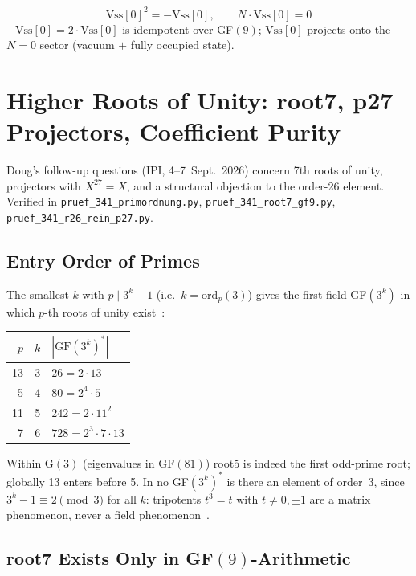 \begin{equation}
  \text{Vss}[0]^2 = -\text{Vss}[0], \qquad N \cdot \text{Vss}[0] = 0
\end{equation}
$-\text{Vss}[0] = 2\cdot\text{Vss}[0]$ is idempotent over GF$(9)$;
$\text{Vss}[0]$ projects onto the $N=0$ sector (vacuum $+$ fully occupied state).

\section{Higher Roots of Unity: root7, p27 Projectors, Coefficient Purity}

Doug's follow-up questions (IPI, 4--7~Sept.~2026) concern 7th roots of unity,
projectors with $X^{27}=X$, and a structural objection to the order-26 element.
Verified in \texttt{pruef\_341\_primordnung.py},
\texttt{pruef\_341\_root7\_gf9.py}, \texttt{pruef\_341\_r26\_rein\_p27.py}.

\subsection{Entry Order of Primes}

The smallest $k$ with $p \mid 3^k-1$ (i.e.\ $k=\mathrm{ord}_p(3)$) gives the
first field GF$(3^k)$ in which $p$-th roots of unity exist~\BM:
\begin{center}
\begin{tabular}{rcl}
\toprule
$p$ & $k$ & $|\text{GF}(3^k)^*|$ \\
\midrule
13 & 3 & $26 = 2\cdot13$ \\
5  & 4 & $80 = 2^4\cdot5$ \\
11 & 5 & $242 = 2\cdot11^2$ \\
7  & 6 & $728 = 2^3\cdot7\cdot13$ \\
\bottomrule
\end{tabular}
\end{center}
Within G$(3)$ (eigenvalues in GF$(81)$) root5 is indeed the first odd-prime root;
globally 13 enters before 5. In no GF$(3^k)^*$ is there an element of order~3,
since $3^k-1 \equiv 2 \pmod 3$ for all $k$: tripotents $t^3=t$ with $t\neq0,\pm1$
are a matrix phenomenon, never a field phenomenon~\BM.

\subsection{root7 Exists Only in GF$(9)$-Arithmetic}

